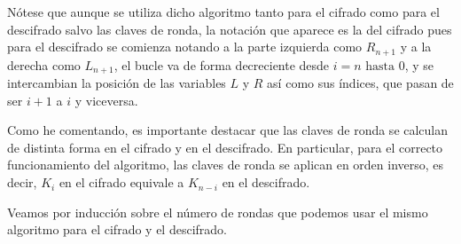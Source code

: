 Nótese que aunque se utiliza dicho algoritmo tanto para el cifrado como para el descifrado salvo las claves de ronda, la notación que aparece es la del cifrado pues para el descifrado se comienza notando a la parte izquierda como $R_{n+1}$ y a la derecha como $L_{n+1}$, el bucle va de forma decreciente desde $i = n \text{ hasta } 0$, y se intercambian la posición de las variables $L$ y $R$ así como sus índices, que pasan de ser $i+1$ a $i$ y viceversa. 

Como he comentando, es importante destacar que las claves de ronda se calculan de distinta forma en el cifrado y en el descifrado. En particular, para el correcto funcionamiento del algoritmo, las claves de ronda se aplican en orden inverso, es decir, $K_i$ en el cifrado equivale a $K_{n-i}$ en el descifrado.

Veamos por inducción sobre el número de rondas que podemos usar el mismo algoritmo para el cifrado y el descifrado.
